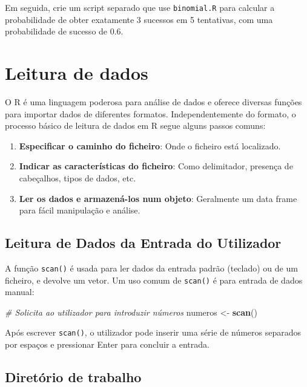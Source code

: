 \documentclass[
]{book}
\newenvironment{Shaded}{\begin{snugshade}}{\end{snugshade}}
\newcommand{\CommentTok}[1]{\textcolor[rgb]{0.56,0.35,0.01}{\textit{#1}}}
\newcommand{\FunctionTok}[1]{\textcolor[rgb]{0.13,0.29,0.53}{\textbf{#1}}}
\newcommand{\NormalTok}[1]{#1}
\newcommand{\OtherTok}[1]{\textcolor[rgb]{0.56,0.35,0.01}{#1}}
\providecommand{\tightlist}{%
  \setlength{\itemsep}{0pt}\setlength{\parskip}{0pt}}
\begin{document}
Em seguida, crie um script separado que use \texttt{binomial.R} para calcular a probabilidade de obter exatamente 3 sucessos em 5 tentativas, com uma probabilidade de sucesso de 0.6.

\chapter{Leitura de dados}\label{leitura-de-dados}

O R é uma linguagem poderosa para análise de dados e oferece diversas
funções para importar dados de diferentes formatos. Independentemente do
formato, o processo básico de leitura de dados em R segue alguns passos
comuns:

\begin{enumerate}
\def\labelenumi{\arabic{enumi}.}
\tightlist
\item
  \textbf{Especificar o caminho do ficheiro}: Onde o ficheiro está
  localizado.
\item
  \textbf{Indicar as características do ficheiro}: Como delimitador,
  presença de cabeçalhos, tipos de dados, etc.
\item
  \textbf{Ler os dados e armazená-los num objeto}: Geralmente um data frame
  para fácil manipulação e análise.
\end{enumerate}

\section{Leitura de Dados da Entrada do Utilizador}\label{leitura-de-dados-da-entrada-do-utilizador}

A função \texttt{scan()} é usada para ler dados da entrada padrão (teclado) ou
de um ficheiro, e devolve um vetor. Um uso comum de \texttt{scan()} é para
entrada de dados manual:

\begin{Shaded}
\begin{Highlighting}[]
\CommentTok{\# Solicita ao utilizador para introduzir números}
\NormalTok{numeros }\OtherTok{\textless{}{-}} \FunctionTok{scan}\NormalTok{()}
\end{Highlighting}
\end{Shaded}

Após escrever \texttt{scan()}, o utilizador pode inserir uma série de números
separados por espaços e pressionar Enter para concluir a entrada.

\section{Diretório de trabalho}\label{diretuxf3rio-de-trabalho}
\end{document}
